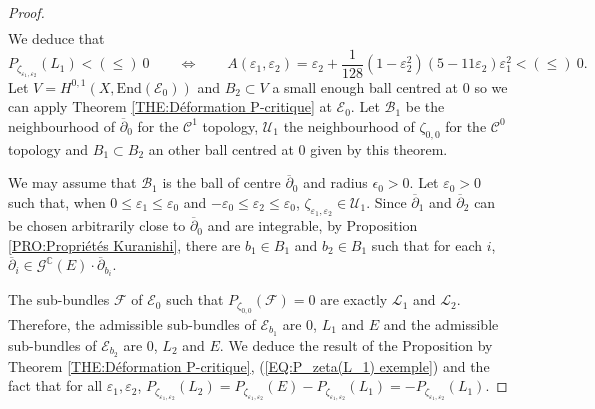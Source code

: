 \documentclass{article}
\theoremstyle{remark}
\theoremstyle{definition}
\newcommand{\C}{\mathbb{C}}
\newcommand{\End}{\mathrm{End}}
\newcommand{\E}{\mathcal{E}}
\newcommand{\F}{\mathcal{F}}
\newcommand{\G}{\mathcal{G}}
\newcommand{\mB}{\mathcal{B}}
\newcommand{\mC}{\mathcal{C}}
\newcommand{\mU}{\mathcal{U}}
\newcommand{\mL}{\mathcal{L}}
\newcommand{\dbar}{\overline{\partial}}
\renewcommand{\leq}{\leqslant}
\begin{document}
\begin{proof}
\begin{align*}
\end{align*}
We deduce that
\begin{equation}\label{EQ:P_zeta(L_1) exemple}
    P_{\zeta_{\varepsilon_1,\varepsilon_2}}(L_1) < (\leq)\ 0 \qquad \Longleftrightarrow \qquad A(\varepsilon_1,\varepsilon_2) = \varepsilon_2 + \frac{1}{128}(1 - \varepsilon_2^2)(5 - 11\varepsilon_2)\varepsilon_1^2 < (\leq)\ 0.
\end{equation}
Let $V = H^{0,1}(X,\End(\E_0))$ and $B_2 \subset V$ a small enough ball centred at $0$ so we can apply Theorem \ref{THE:Déformation P-critique} at $\E_0$. Let $\mB_1$ be the neighbourhood of $\dbar_0$ for the $\mC^1$ topology, $\mU_1$ the neighbourhood of $\zeta_{0,0}$ for the $\mC^0$ topology and $B_1 \subset B_2$ an other ball centred at $0$ given by this theorem.

We may assume that $\mB_1$ is the ball of centre $\dbar_0$ and radius $\epsilon_0 > 0$. Let $\varepsilon_0 > 0$ such that, when $0 \leq \varepsilon_1 \leq \varepsilon_0$ and $-\varepsilon_0 \leq \varepsilon_2 \leq \varepsilon_0$, $\zeta_{\varepsilon_1,\varepsilon_2} \in \mU_1$. Since $\dbar_1$ and $\dbar_2$ can be chosen arbitrarily close to $\dbar_0$ and are integrable, by Proposition \ref{PRO:Propriétés Kuranishi}, there are $b_1 \in B_1$ and $b_2 \in B_1$ such that for each $i$, $\dbar_i \in \G^\C(E) \cdot \dbar_{b_i}$.

The sub-bundles $\F$ of $\E_0$ such that $P_{\zeta_{0,0}}(\F) = 0$ are exactly $\mL_1$ and $\mL_2$. Therefore, the admissible sub-bundles of $\E_{b_1}$ are $0$, $L_1$ and $E$ and the admissible sub-bundles of $\E_{b_2}$ are $0$, $L_2$ and $E$. We deduce the result of the Proposition by Theorem \ref{THE:Déformation P-critique}, (\ref{EQ:P_zeta(L_1) exemple}) and the fact that for all $\varepsilon_1,\varepsilon_2$, $P_{\zeta_{\varepsilon_1,\varepsilon_2}}(L_2) = P_{\zeta_{\varepsilon_1,\varepsilon_2}}(E) - P_{\zeta_{\varepsilon_1,\varepsilon_2}}(L_1) = -P_{\zeta_{\varepsilon_1,\varepsilon_2}}(L_1)$.
\end{proof}
\end{document}
